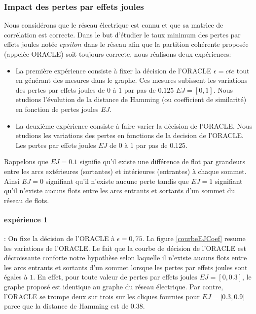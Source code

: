 \subsubsection{Impact des pertes par effets joules}
Nous consid\'erons que le r\'eseau \'electrique est connu et que sa matrice de corr\'elation est correcte. 
Dans le but d'\'etudier le taux minimum des pertes par effets joules not\'ee $epsilon$ dans le r\'eseau afin que la partition coh\'erente propos\'ee (appel\'ee ORACLE) soit toujours correcte, nous r\'ealisons deux exp\'eriences: 
\begin{itemize}
\item La premi\`ere  exp\'erience consiste \`a fixer la d\'ecision de l'ORACLE $\epsilon=cte$ tout en g\'en\'erant des mesures dans le graphe. Ces mesures subissent les variations des pertes par effets joules de $0$ \`a $1$ par pas de $0.125$ $EJ=[0,1]$. 
Nous etudions l'\'evolution de la distance de Hamming (ou coefficient de similarit\'e) en fonction de pertes joules $EJ$. 
\item La deuxi\`eme exp\'erience consiste \`a faire varier la d\'ecision de l'ORACLE. Nous etudions les variations des pertes en fonctions de la decision de l'ORACLE.  Les pertes par effets joules $EJ$ de $0$ \`a $1$ par pas de $0.125$. 
\end{itemize}
Rappelons que $EJ=0.1$ signifie qu'il existe une diff\'erence de flot par grandeurs entre les arcs ext\'erieures (sortantes) et int\'erieures (entrantes) \`a chaque sommet. Ainsi $EJ=0$ signifiant qu'il n'existe aucune perte tandis que  $EJ=1$ signifiant qu'il n'existe aucuns flots entre les arcs entrants et sortants d'un sommet du r\'eseau de flots.
\paragraph{exp\'erience 1} :
On fixe la d\'ecision de l'ORACLE \`a $\epsilon=0,75$. 
La figure \ref{courbeEJCoef} resume les variations de l'ORACLE. 
Le fait que la courbe de d\'ecision de l'ORACLE est d\'ecroissante conforte notre hypoth\`ese selon laquelle il n'existe aucuns flots entre les arcs entrants et sortants d'un sommet lorsque les pertes par effets joules sont \'egales \`a $1$. En effet, pour toute valeur de pertes par effets joules  $EJ=[0,0.3]$, le graphe propos\'e est identique au graphe du r\'eseau \'electrique. Par contre, l'ORACLE se trompe deux sur trois sur les cliques fournies pour $EJ = ]0.3,0.9]$ parce que la distance de Hamming est de $0.38$. 

